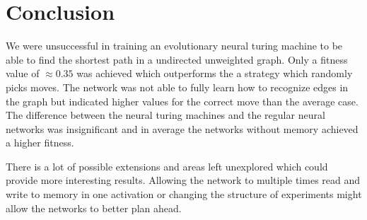 
\section{Conclusion}
We were unsuccessful in training an evolutionary neural turing machine to be able to find the shortest path in a undirected unweighted graph. Only a fitness value of $\approx0.35 $ was achieved which outperforms the a strategy which randomly picks moves. The network was not able to fully learn how to recognize edges in the graph but indicated higher values for the correct move than the average case. 
The difference between the neural turing machines and the regular neural networks was insignificant and in average the networks without memory achieved a higher fitness. 

\newpar There is a lot of possible extensions and areas left unexplored which could provide more interesting results. Allowing the network to multiple times read and write to memory in one activation or changing the structure of experiments might allow the networks to better plan ahead. 
